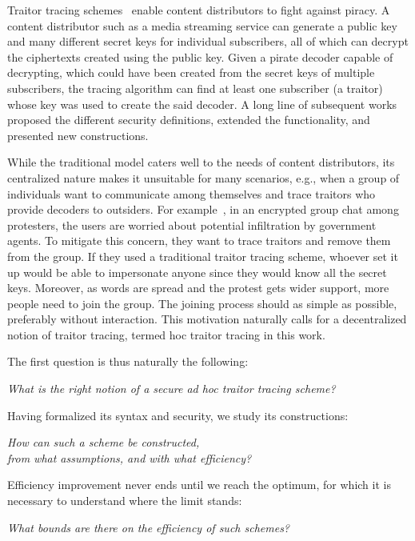 Traitor tracing schemes~\cite{C:ChoFiaNao94} enable content distributors to fight against piracy.
A content distributor such as a media streaming service can generate a public key and many different secret keys for individual subscribers,
all of which can decrypt the ciphertexts created using the public key.
Given a pirate decoder capable of decrypting,
which could have been created from the secret keys of multiple subscribers,
the tracing algorithm can find at least one subscriber (a traitor) whose key was used to create the said decoder.
A long line of subsequent works~\cite{EC:BonSahWat06,CCS:BonWat06,CCS:BonNao08,C:BonZha14,EC:NisWicZha16,STOC:GoyKopWat18,C:GKRW18,TCC:CVWWW18,C:GQWW19,TCC:GoyKopWat19,C:Zhandry20,C:Zhandry21} proposed the different security definitions, extended the functionality, and presented new constructions.

While the traditional model caters well to the needs of content distributors,
its centralized nature makes it unsuitable for many scenarios,
e.g., when a group of individuals want to communicate among themselves and
trace traitors who provide decoders to outsiders.
For example~\cite{C:Zhandry21},
in an encrypted group chat among protesters,
the users are worried about potential infiltration by government agents.
To mitigate this concern,
they want to trace traitors and remove them from the group.
If they used a traditional traitor tracing scheme,
whoever set it up would be able to impersonate anyone
since they would know all the secret keys.
Moreover, as words are spread and the protest gets wider support,
more people need to join the group.
The joining process should as simple as possible,
preferably without interaction.
This motivation naturally calls for a decentralized notion of traitor tracing, termed \ad hoc traitor tracing in this work.

The first question is thus naturally the following:
\begin{center}
\itshape
What is the right notion of a secure ad hoc traitor tracing scheme?\\
\end{center}
Having formalized its syntax and security,
we study its constructions:
\begin{center}
\itshape
How can such a scheme be constructed,\\
from what assumptions, and with what efficiency?
\end{center}
Efficiency improvement never ends until we reach the optimum,
for which it is necessary to understand where the limit stands:
\begin{center}
\itshape
What bounds are there on the efficiency of such schemes?
\end{center}
